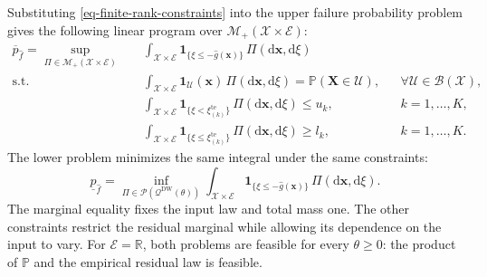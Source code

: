 \documentclass[review,11pt,3p,authoryear,nopreprintline]{elsarticle}
\begin{document}
Substituting \eqref{eq-finite-rank-constraints} into the upper failure probability problem gives the following linear program over $\mathcal M_+(\mathcal X\times\mathcal E)$:
\begin{equation}
  \begin{aligned}
    \overline p_{\hat f}
    =\sup_{\Pi\in\mathcal M_+(\mathcal X\times\mathcal E)}\quad&
      \int_{\mathcal X\times\mathcal E}
      \mathbf1_{\{\xi\le -\hat g(\bm x)\}}\,\Pi(\mathrm d\bm x,\mathrm d\xi)\\
    \text{s.t.}\quad&
      \int_{\mathcal X\times\mathcal E}
      \mathbf1_{\mathcal U}(\bm x)\,\Pi(\mathrm d\bm x,\mathrm d\xi)
      =\mathbb P(\bm X\in\mathcal U),
      &&\forall \mathcal U\in\mathcal B(\mathcal X),\\
    &\int_{\mathcal X\times\mathcal E}
      \mathbf1_{\{\xi<\xi_{(k)}^{\mathrm{te}}\}}\,\Pi(\mathrm d\bm x,\mathrm d\xi)\le u_k,
      &&k=1,\ldots,K,\\
    &\int_{\mathcal X\times\mathcal E}
      \mathbf1_{\{\xi\le \xi_{(k)}^{\mathrm{te}}\}}\,\Pi(\mathrm d\bm x,\mathrm d\xi)\ge l_k,
      &&k=1,\ldots,K.
  \end{aligned}
  \label{eq-measure-upper}
\end{equation}
The lower problem minimizes the same integral under the same constraints:
\begin{equation}
  \underline p_{\hat f}
  =\inf_{\Pi\in\mathcal P(\mathcal Q^{\mathrm{DW}}(\theta))}
    \int_{\mathcal X\times\mathcal E}
    \mathbf1_{\{\xi\le -\hat g(\bm x)\}}\,\Pi(\mathrm d\bm x,\mathrm d\xi).
  \label{eq-measure-lower}
\end{equation}
The marginal equality fixes the input law and total mass one. The other constraints restrict the residual marginal while allowing its dependence on the input to vary. For $\mathcal E=\mathbb R$, both problems are feasible for every $\theta\ge0$: the product of $\mathbb P$ and the empirical residual law is feasible.
\end{document}

